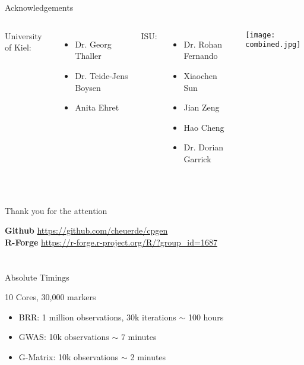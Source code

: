 \documentclass[xcolor=dvipsnames,aspectratio=169]{beamer}
\begin{document}
\section*{}
\begin{frame}{Acknowledgements}
\begin{columns}[c]
\column{2.3in}
University of Kiel:
\begin{itemize}
\item Dr. Georg Thaller
\item Dr. Teide-Jens Boysen
\item Anita Ehret
\end{itemize}
ISU:
\begin{itemize}
\item Dr. Rohan Fernando
\item Xiaochen Sun
\item Jian Zeng
\item Hao Cheng
\item Dr. Dorian Garrick
\end{itemize}
\column{2.3in}
\texttt{[image: combined.jpg]}
\end{columns}
\end{frame}









\section{}
\begin{frame}
\begin{center}
\huge
Thank you for the attention
\end{center}
\vspace{40pt}
\textbf{Github} \url{https://github.com/cheuerde/cpgen}\\
\textbf{R-Forge} \url{https://r-forge.r-project.org/R/?group_id=1687}
\end{frame}



\section*{}
\subsection*{}
\begin{frame}[noframenumbering]{Absolute Timings}

10 Cores, 30,000 markers

\begin{itemize}
\item BRR: 1 million observations, 30k iterations $\sim$ 100 hours 
\item GWAS: 10k observations $\sim$  7 minutes
\item G-Matrix: 10k observations $\sim$ 2 minutes
\end{itemize}
\end{frame}
\end{document}
